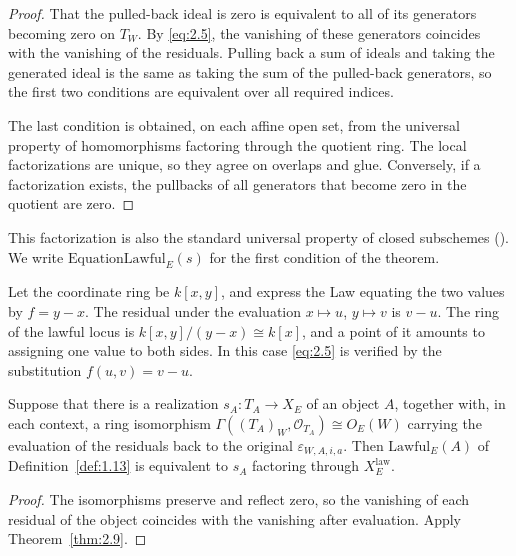 \begin{proof}

That the pulled-back ideal is zero is equivalent to all of its generators becoming zero on
$T_W$. By \eqref{eq:2.5}, the vanishing of these generators coincides with the vanishing of
the residuals. Pulling back a sum of ideals and taking the generated ideal is the same as taking the sum of
the pulled-back generators, so the first two conditions are equivalent over all required
indices.

The last condition is obtained, on each affine open set, from the universal property of
homomorphisms factoring through the quotient ring. The local factorizations are unique, so
they agree on overlaps and glue. Conversely, if a factorization exists, the pullbacks of
all generators that become zero in the quotient are zero.

\end{proof}

This factorization is also the standard universal property of closed subschemes
(\cite[\href{https://stacks.math.columbia.edu/tag/01HP}{Lemma~26.4.6, Tag~01HP}]{Stacks}).
We write $\mathrm{EquationLawful}_E(s)$ for the first condition of the theorem.

\begin{example}\label{ex:2.10}

Let the coordinate ring be $k[x,y]$, and express the Law equating the two values by
$f=y-x$. The residual under the evaluation $x\mapsto u$, $y\mapsto v$ is $v-u$. The ring of
the lawful locus is $k[x,y]/(y-x)\cong k[x]$, and a point of it amounts to assigning one
value to both sides. In this case \eqref{eq:2.5} is verified by the substitution
$f(u,v)=v-u$.

\end{example}

\begin{corollary}\label{cor:2.11}

Suppose that there is a realization $s_A:T_A\to X_E$ of an object $A$, together with, in
each context, a ring isomorphism $\Gamma((T_A)_W,\mathcal{O}_{T_A})\cong O_E(W)$ carrying
the evaluation of the residuals back to the original $\varepsilon_{W,A,i,a}$. Then
$\mathrm{Lawful}_E(A)$ of Definition~\ref{def:1.13} is equivalent to $s_A$ factoring
through $X_E^{\mathrm{law}}$.

\end{corollary}

\begin{proof}

The isomorphisms preserve and reflect zero, so the vanishing of each residual of the
object coincides with the vanishing after evaluation. Apply Theorem~\ref{thm:2.9}.

\end{proof}

